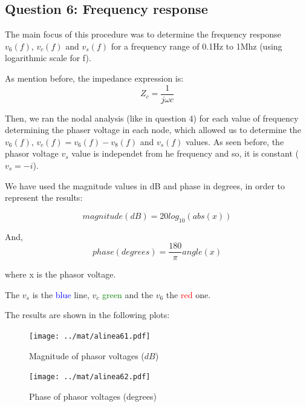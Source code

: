 \subsection{Question 6: Frequency response}
The main focus of this procedure was to determine the frequency response $v_6(f)$, $v_c(f)$ and $v_s(f)$ for a frequency range of 0.1Hz to 1Mhz (using logarithmic scale for f). \par
As mention before, the impedance expression is:
\begin{equation}
     Z_c = \frac{1}{j\omega c}
\end{equation}\par
Then, we ran the nodal analysis (like in question 4) for each value of frequency determining the phaser voltage in each node, which allowed us to determine the $v_6(f)$, $v_c(f) = v_6(f) - v_8(f)$ and $v_s(f)$ values. As seen before, the phasor voltage $v_s$ value is independet from he frequency and so, it is constant ($v_s = -i$). \par
We have used the magnitude values in dB and phase in degrees, in order to represent the results:\par
\begin{equation}
     magnitude (dB) = 20log_{10}(abs(x))
\end{equation}\par
And,
\begin{equation}
     phase (degrees) = \frac{180}{\pi}angle(x)
\end{equation}\par
where x is the phasor voltage.\par
The $v_s$ is the \textcolor{blue}{blue} line, $v_c$ \textcolor{green}{green} and the $v_6$ the \textcolor{red}{red} one.\par
The results are shown in the following plots:

\begin{figure}[H] \centering
\texttt{[image: ../mat/alinea61.pdf]}
\caption{Magnitude of phasor voltages ($dB$)}
\label{fig:plot6}
\end{figure}

\begin{figure}[H] \centering
\texttt{[image: ../mat/alinea62.pdf]}
\caption{Phase of phasor voltages (degrees)}
\label{fig:plot7}
\end{figure}





